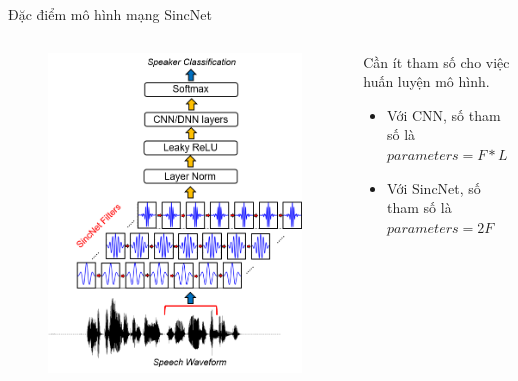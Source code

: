 \documentclass[notheorems, aspectratio=54]{beamer}
\begin{document}
\begin{frame}{Đặc điểm mô hình mạng SincNet}
	\begin{columns}
		\begin{column}{0.47\textwidth}
			\begin{figure}[H]
				\includegraphics[width=0.9\linewidth]{images/SincNet.png}
			\end{figure}
		\end{column}
		\begin{column}{0.5\textwidth}
			Cần ít tham số cho việc huấn luyện mô hình. \newline
			\begin{itemize}
				\item Với CNN, số tham số là $parameters = F * L$
				\item Với SincNet, số tham số là $parameters = 2F$
			\end{itemize}
		\end{column}
	\end{columns}
\end{frame}
\end{document}
